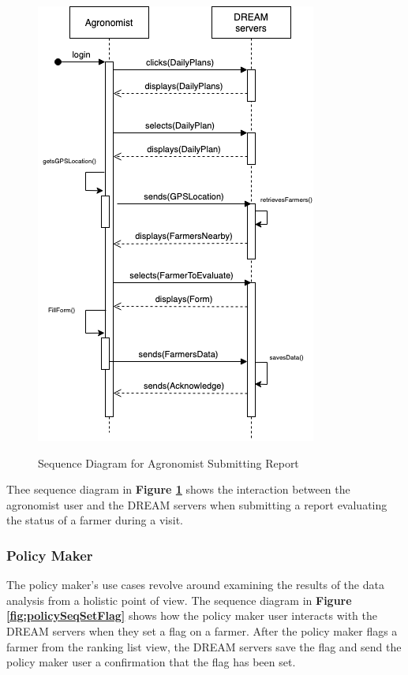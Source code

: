 \begin{figure}[hpt!]
\centering
\includegraphics[scale=0.42]{Files/sequence_disgrams/thePNGs/agronomist_sendReport.png}\\
\caption{\label{fig:agrSeqSendReport}Sequence Diagram for Agronomist Submitting Report}
\end{figure}

\begin{flushleft}
Thee sequence diagram in \textbf{Figure \ref{fig:agrSeqSendReport}} shows the interaction between the agronomist user and the DREAM servers when submitting a report evaluating the status of a farmer during a visit.
\end{flushleft}


\subsubsection{Policy Maker}


\begin{flushleft}
The policy maker's use cases revolve around examining the results of the data analysis from a holistic point of view. The sequence diagram in \textbf{Figure \ref{fig:policySeqSetFlag}} shows how the policy maker user interacts with the DREAM servers when they set a flag on a farmer. After the policy maker flags a farmer from the ranking list view, the DREAM servers save the flag and send the policy maker user a confirmation that the flag has been set.
\end{flushleft}

